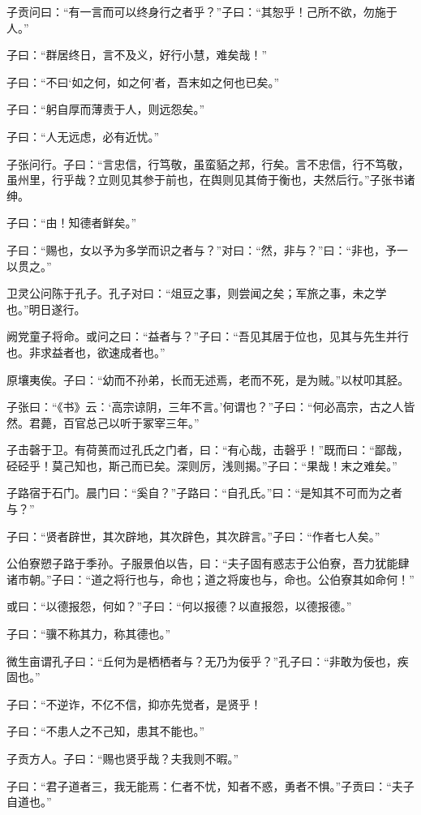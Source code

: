 \documentclass[a5paper]{ctexbook}
\begin{document}
    子贡问曰：“有一言而可以终身行之者乎？”子曰：“其恕乎！己所不欲，勿施于人。”

    子曰：“群居终日，言不及义，好行小慧，难矣哉！”

    子曰：“不曰‘如之何，如之何’者，吾末如之何也已矣。”

    子曰：“躬自厚而薄责于人，则远怨矣。”

    子曰：“人无远虑，必有近忧。”

    子张问行。子曰：“言忠信，行笃敬，虽蛮貊之邦，行矣。言不忠信，行不笃敬，虽州里，行乎哉？立则见其参于前也，在舆则见其倚于衡也，夫然后行。”子张书诸绅。

    子曰：“由！知德者鲜矣。”

    子曰：“赐也，女以予为多学而识之者与？”对曰：“然，非与？”曰：“非也，予一以贯之。”

    卫灵公问陈于孔子。孔子对曰：“俎豆之事，则尝闻之矣；军旅之事，未之学也。”明日遂行。

    阙党童子将命。或问之曰：“益者与？”子曰：“吾见其居于位也，见其与先生并行也。非求益者也，欲速成者也。”

    原壤夷俟。子曰：“幼而不孙弟，长而无述焉，老而不死，是为贼。”以杖叩其胫。

    子张曰：“《书》云：‘高宗谅阴，三年不言。’何谓也？”子曰：“何必高宗，古之人皆然。君薨，百官总己以听于冢宰三年。”

    子击磬于卫。有荷蒉而过孔氏之门者，曰：“有心哉，击磬乎！”既而曰：“鄙哉，硁硁乎！莫己知也，斯己而已矣。深则厉，浅则揭。”子曰：“果哉！末之难矣。”

    子路宿于石门。晨门曰：“奚自？”子路曰：“自孔氏。”曰：“是知其不可而为之者与？”

    子曰：“贤者辟世，其次辟地，其次辟色，其次辟言。”子曰：“作者七人矣。”

    公伯寮愬子路于季孙。子服景伯以告，曰：“夫子固有惑志于公伯寮，吾力犹能肆诸市朝。”子曰：“道之将行也与，命也；道之将废也与，命也。公伯寮其如命何！”

    或曰：“以德报怨，何如？”子曰：“何以报德？以直报怨，以德报德。”

    子曰：“骥不称其力，称其德也。”

    微生亩谓孔子曰：“丘何为是栖栖者与？无乃为佞乎？”孔子曰：“非敢为佞也，疾固也。”

    子曰：“不逆诈，不亿不信，抑亦先觉者，是贤乎！

    子曰：“不患人之不己知，患其不能也。”

    子贡方人。子曰：“赐也贤乎哉？夫我则不暇。”

    子曰：“君子道者三，我无能焉：仁者不忧，知者不惑，勇者不惧。”子贡曰：“夫子自道也。”
\end{document}
